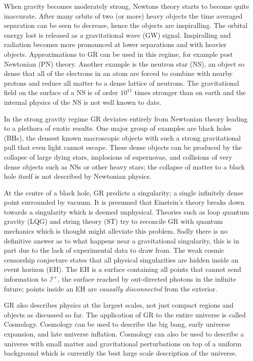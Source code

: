 When gravity becomes moderately strong, Newtons theory starts to become quite inaccurate. After many orbits of two (or more) heavy objects the time averaged separation can be seen to decrease, hence the objects are inspiralling. The orbital energy lost is released as a gravitational wave (GW) signal. Inspiralling and radiation becomes more pronounced at lower separations and with heavier objects. Approximations to GR can be used in this regime, for example post Newtonian (PN) theory. Another example is the neutron star (NS), an object so dense that all of the electrons in an atom are forced to combine with nearby protons and reduce all matter to a dense lattice of neutrons. The gravitational field on the surface of a NS is of order $10^{11}$ times stronger than on earth and the internal physics of the NS is not well known to date.

In the strong gravity regime GR deviates entirely from Newtonian theory leading to a plethora of exotic results. One major group of examples are black holes (BHs), the densest known macroscopic objects with such a strong gravitational pull that even light cannot escape. These dense objects can be produced by the collapse of large dying stars, implosions of supernovae, and collisions of very dense objects such as NSs or other heavy stars; the collapse of matter to a black hole itself is not described by Newtonian physics.

At the centre of a black hole, GR predicts a singularity; a single infinitely dense point surrounded by vacuum. It is presumed that Einstein's theory breaks down towards a singularity which is deemed unphysical. Theories such as loop quantum gravity (LQG) and string theory (ST) try to reconcile GR with quantum mechanics which is thought might alleviate this problem. Sadly there is no definitive answer as to what happens near a gravitational singularity, this is in part due to the lack of experimental data to draw from. The weak cosmic censorship conjecture states that all physical singularities are hidden inside an event horizon (EH). The EH is a surface containing all points that cannot send information to $\mathcal{I}^+$, the surface reached by out-directed photons in the infinite future; points inside an EH are {\it causally disconnected} from the exterior. 

GR also describes physics at the largest scales, not just compact regions and objects as discussed so far. The application of GR to the entire universe is called Cosmology. Cosmology can be used to describe the big bang, early universe expansion, and late universe inflation. Cosmology can also be used to describe a universe with small matter and gravitational perturbations on top of a uniform background which is currently the best large scale description of the universe.

